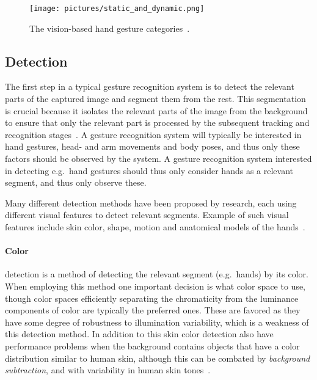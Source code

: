 \begin{figure}%
	\texttt{[image: pictures/static\_and\_dynamic.png]}
	\caption[The vision-based hand gesture categories]{The vision-based hand gesture categories~\citep{Kanniche2009}.}
	\label{fig:static_and_dynamic}
\end{figure} 

\subsection{Detection}
The first step in a typical gesture recognition system is to detect the relevant parts of the captured image and segment them from the rest. 
This segmentation is crucial because it isolates the relevant parts of the image from the background to ensure that only the relevant part is processed by the subsequent 
tracking and recognition stages~\citep{Cote2006}. 
A gesture recognition system will typically be interested in hand gestures, head- and arm movements and body poses, and thus only these factors should be observed by the system.
A gesture recognition system interested in detecting e.g.~hand gestures should thus only consider hands as a relevant segment, and thus only observe these.

Many different detection methods have been proposed by research, each using different visual features to detect relevant segments. 
Example of such visual features include skin color, shape, motion and anatomical models of the hands~\citep{Cote2006}.

\paragraph{Color} detection is a method of detecting the relevant segment (e.g.~hands) by its color. 
When employing this method one important decision is what color space to use, though color spaces efficiently separating the chromaticity from
the luminance components of color are typically the preferred ones. These are favored as they have some degree of robustness to illumination variability, which
is a weakness of this detection method. In addition to this skin color detection also have performance problems when the background contains objects that have a 
color distribution similar to human skin, although this can be combated by \textit{background subtraction}, and with variability in human skin tones~\citep{Rautaray2015}.

